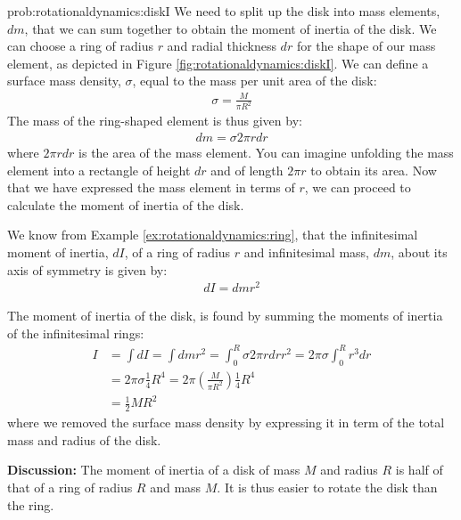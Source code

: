 \begin{solution}{prob:rotationaldynamics:diskI}\label{soln:rotationaldynamics:diskI}
We need to split up the disk into mass elements, $dm$, that we can sum together to obtain the moment of inertia of the disk. We can choose a ring of radius $r$ and radial thickness $dr$ for the shape of our mass element, as depicted in Figure \ref{fig:rotationaldynamics:diskI}.
We can define a surface mass density, $\sigma$, equal to the mass per unit area of the disk:
\begin{align*}
\sigma = \frac{M}{\pi R^2}
\end{align*}
The mass of the ring-shaped element is thus given by:
\begin{align*}
dm = \sigma 2\pi r dr
\end{align*}
where $2\pi r dr$ is the area of the mass element. You can imagine unfolding the mass element into a rectangle of height $dr$ and of length $2\pi r$ to obtain its area. Now that we have expressed the mass element in terms of $r$, we can proceed to calculate the moment of inertia of the disk.

We know from Example \ref{ex:rotationaldynamics:ring}, that the infinitesimal moment of inertia, $dI$, of a ring of radius $r$ and infinitesimal mass, $dm$, about its axis of symmetry is given by:
\begin{align*}
dI = dm r^2
\end{align*}

The moment of inertia of the disk, is found by summing the moments of inertia of the infinitesimal rings:
\begin{align*}
I &=\int dI = \int dm r^2 = \int_0^R \sigma 2\pi r dr r^2 =2\pi \sigma \int_0^R  r^3 dr \\
&=2 \pi \sigma \frac{1}{4}R^4 = 2\pi \left( \frac{M}{\pi R^2} \right) \frac{1}{4}R^4\\
&=\frac{1}{2}MR^2
\end{align*}
where we removed the surface mass density by expressing it in term of the total mass and radius of the disk. 

\textbf{Discussion:} The moment of inertia of a disk of mass $M$ and radius $R$ is half of that of a ring of radius $R$ and mass $M$. It is thus easier to rotate the disk than the ring. 
\end{solution}

